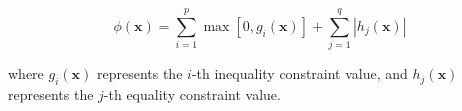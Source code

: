 \begin{equation}
\phi (\mathbf{x})=\sum_{i=1}^{p} \max \left[0, g_{i}(\mathbf{x})\right]+\sum_{j=1}^{q}\left|h_{j}(\mathbf{x})\right|
\end{equation}

where $g_i(\textbf{x})$ represents the $i$-th inequality constraint value, and $h_j(\textbf{x})$ represents the $j$-th equality constraint value. 